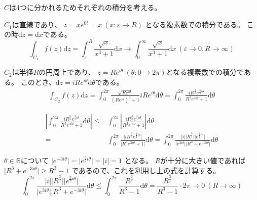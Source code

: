 \documentclass[12pt,b5paper]{ltjsarticle}
\begin{document}
$C$は4つに分かれるためそれぞれの積分を考える。

$C_1$は直線であり、
$z=x e^{0i}=x \ (x:\varepsilon \to R)$
となる複素数での積分である。
この時$\mathrm{d}z=\mathrm{d}x$である。
\begin{equation}
 \int_{C_1} f(z)\mathrm{d}z
  =\int_{\varepsilon}^{R} \frac{\sqrt{x}}{x^3+1}\mathrm{d}x
  \to \int_{0}^{\infty} \frac{\sqrt{x}}{x^3+1} \mathrm{d}x \ (\varepsilon\to 0, R\to\infty)
\end{equation}

$C_2$は半径$R$の円周上であり、
$z=Re^{i\theta} \ (\theta : 0\to 2\pi)$となる複素数での積分である。
このとき、$\mathrm{d}z = iRe^{i\theta}\mathrm{d}\theta$である。
\begin{align}
 \int_{C_2} f(z)\mathrm{d}z
 = \int_{0}^{2\pi} \frac{\sqrt{Re^{i\theta}}}{(Re^{i\theta})^3+1} iRe^{i\theta}\mathrm{d}\theta
 = \int_{0}^{2\pi} \frac{iR^{\frac{3}{2}}e^{\frac{3}{2}i\theta}}{R^3 e^{3i\theta}+1} \mathrm{d}\theta
\end{align}


\begin{align}
  \left\lvert \int_{0}^{2\pi} \frac{iR^{\frac{3}{2}}e^{\frac{3}{2}i\theta}}{R^3 e^{3i\theta}+1} \mathrm{d}\theta \right\rvert
  \leq &
   \int_{0}^{2\pi} \left\lvert \frac{iR^{\frac{3}{2}}e^{\frac{3}{2}i\theta}}{R^3 e^{3i\theta}+1}  \right\rvert \mathrm{d}\theta\\
   = &
   \int_{0}^{2\pi}  \frac{\lvert iR^{\frac{3}{2}}e^{\frac{3}{2}i\theta} \rvert}{\lvert R^3 e^{3i\theta}+1 \rvert}   \mathrm{d}\theta
   =
   \int_{0}^{2\pi}
   \frac{\lvert i \rvert \lvert R^{\frac{3}{2}}\rvert \lvert e^{\frac{3}{2}i\theta} \rvert}
   {\lvert e^{3i\theta} \rvert \lvert R^3 + e^{-3i\theta} \rvert}
   \mathrm{d}\theta
\end{align}

$\theta\in\mathbb{R}$について
$\lvert e^{-3i\theta} \rvert = \lvert e^{\frac{3}{2}i\theta} \rvert =\lvert i \rvert= 1$
となる。
$R$が十分に大きい値であれば
$\lvert R^3 + e^{-3i\theta} \rvert \geq  R^3 -1$
であるので、これを利用し上の式を計算する。
\begin{equation}
   \int_{0}^{2\pi}
   \frac{\lvert i \rvert \lvert R^{\frac{3}{2}}\rvert \lvert e^{\frac{3}{2}i\theta} \rvert}
   {\lvert e^{3i\theta} \rvert \lvert R^3 + e^{-3i\theta} \rvert}
   \mathrm{d}\theta
   \leq
  \int_{0}^{2\pi}\frac{R^{\frac{3}{2}}}{R^3-1}\mathrm{d}\theta
  = \frac{R^{\frac{3}{2}}}{R^3-1}\cdot2\pi
  \to 0 \ (R\to\infty)
\end{equation}
\end{document}
